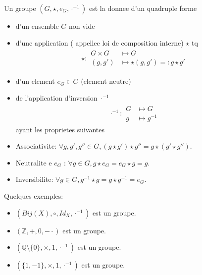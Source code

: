 \documentclass[../main.tex]{subfiles}
\begin{document}
\begin{defn}\label{defn:groupe_abstrait}
	Un groupe $(G,\star, e_G, \cdot^{-1})$ est la donnee d'un quadruple forme
	\begin{itemize}
		\item d'un ensemble $G$ non-vide\\
		\item d'une application ( appellee loi de composition interne) $\star$ tq
			\begin{align*}
				\star :
				\begin{aligned}
				G \times G &\mapsto G\\
				( g,g') &\mapsto \star(g,g') =: g \star g'
				\end{aligned}
			\end{align*}
		\item d'un element $e_G \in G$ (element neutre)\\
		\item de l'application d'inversion $\cdot^{-1}$
			\begin{align*}
				\cdot ^{-1}:
				\begin{aligned}
				G &\mapsto G\\
				g & \mapsto g^{-1}	
				\end{aligned}
			\end{align*}
		ayant les proprietes suivantes\\
	\item Associativite: $\forall g,g',g'' \in G, ( g\star g')\star g'' = g \star(g'\star g'')$.\\
	\item Neutralite e $e_G$ : $\forall g \in G, g \star e_G = e_G \star g = g$.\\
	\item Inversibilite: $\forall g \in G, g^{-1} \star g = g \star g^{-1} = e_G$.
	\end{itemize}
\end{defn}
Quelques exemples:
\begin{itemize}
	\item $(Bij(X), \circ, Id_X, \cdot^{-1}) $ est un groupe.\\
	\item $(\mathbb{Z}, +, 0, - \cdot) $ est un groupe.\\
	\item $( \mathbb{Q}\setminus \{0\}, \times, 1,  \cdot^{-1}) $ est un groupe.\\
	\item $( \{1,-1\}, \times, 1,  \cdot^{-1}) $ est un groupe.\\
\end{itemize}
\end{document}
